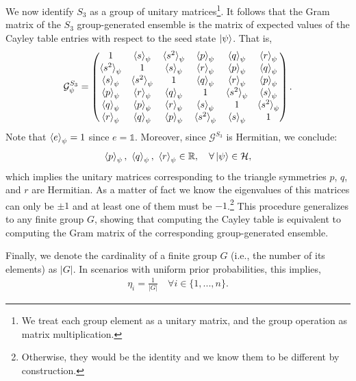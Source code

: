\documentclass[12pt,letterpaper]{article}
\begin{document}
\begin{multicols}{2}
We now identify $S_3$ as a group of unitary matrices\footnote{We treat each group element as a unitary matrix, and the group operation as matrix multiplication.}. It follows that the Gram matrix of the $S_3$ group-generated ensemble is the matrix of expected values of the Cayley table entries with respect to the seed state $\ket{\psi}$. That is,
\begin{align*}
	\mathcal{G}^{S_3}_{\psi} = \begin{pmatrix}
        1 & \braket{s}_\psi & \braket{s^2}_\psi & \braket{p}_\psi & \braket{q}_\psi & \braket{r}_\psi \\ 
        \braket{s^2}_\psi & 1 & \braket{s}_\psi & \braket{r}_\psi & \braket{p}_\psi & \braket{q}_\psi \\
        \braket{s}_\psi & \braket{s^2}_\psi & 1 & \braket{q}_\psi & \braket{r}_\psi & \braket{p}_\psi \\
        \braket{p}_\psi & \braket{r}_\psi & \braket{q}_\psi & 1 & \braket{s^2}_\psi & \braket{s}_\psi \\
        \braket{q}_\psi & \braket{p}_\psi & \braket{r}_\psi & \braket{s}_\psi & 1 & \braket{s^2}_\psi \\
        \braket{r}_\psi & \braket{q}_\psi & \braket{p}_\psi & \braket{s^2}_\psi & \braket{s}_\psi & 1
	\end{pmatrix}.
\end{align*}
Note that $\braket{e}_\psi = 1$ since $e = \mathds{1}$. Moreover, since $\mathcal{G}^{S_3}$ is Hermitian, we conclude:
\begin{align*}
\braket{p}_{\psi},\ \braket{q}_{\psi},\ \braket{r}_{\psi} \in \mathbb{R}, \quad \forall \ket{\psi} \in \mathcal{H},
\end{align*}
which implies the unitary matrices corresponding to the triangle symmetries $p$, $q$, and $r$ are Hermitian. As a matter of fact we know the eigenvalues of this matrices can only be $\pm 1$ and at least one of them must be $-1$.\footnote{Otherwise, they would be the identity and we know them to be different by construction.} This procedure generalizes to any finite group $G$, showing that computing the Cayley table is equivalent to computing the Gram matrix of the corresponding group-generated ensemble.

Finally, we denote the cardinality of a finite group $G$ (i.e., the number of its elements) as $|G|$. In scenarios with uniform prior probabilities, this implies,
\begin{align*}
	\eta_i = \frac{1}{|G|}\quad \forall i\in\{1,...,n\}.
\end{align*}

\end{multicols}
\end{document}

